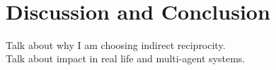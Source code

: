 \documentclass[twoside,twocolumn]{article}
\begin{document}
~\cite{arithmetics_of_mutual_help}\\
~\cite{five_rules_coop}\\
~\cite{evolution_of_cooperation}\\
~\cite{evol_indirect_image}\\
~\cite{evol_graph}\\
~\cite{multilevel_nowak}\\
~\cite{phelps_game_theoretic_analysis}\\
~\cite{spatial}\\
~\cite{heterogenous}\\
~\cite{evoldirindir}\\
~\cite{extortion}\\


\section{Discussion and Conclusion}
Talk about why I am choosing indirect reciprocity.\\
Talk about impact in real life and multi-agent systems.\\
~\cite{sticklebacks}\\
~\cite{prisonersdilemma}\\



{}


\end{document}
